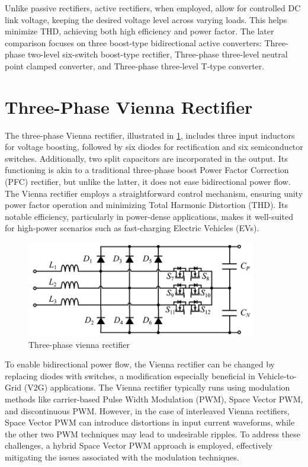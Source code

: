 \documentclass[12pt,a4paper]{book}
\begin{document}
Unlike passive rectifiers, active rectifiers, when employed, allow for controlled DC link voltage, keeping the desired voltage level across varying loads. This helps minimize THD, achieving both high efficiency and power factor. The later comparison focuses on three boost-type bidirectional active converters: Three-phase two-level six-switch boost-type rectifier, Three-phase three-level neutral point clamped converter, and Three-phase three-level T-type converter.

\section{Three-Phase Vienna Rectifier}
The three-phase Vienna rectifier, illustrated in \ref{fig:image4}, includes three input inductors for voltage boosting, followed by six diodes for rectification and six semiconductor switches. Additionally, two split capacitors are incorporated in the output. Its functioning is akin to a traditional three-phase boost Power Factor Correction (PFC) rectifier, but unlike the latter, it does not ease bidirectional power flow. The Vienna rectifier employs a straightforward control mechanism, ensuring unity power factor operation and minimizing Total Harmonic Distortion (THD). Its notable efficiency, particularly in power-dense applications, makes it well-suited for high-power scenarios such as fast-charging Electric Vehicles (EVs).

\begin{figure}[h]
  \centering
  \includegraphics[width=10cm]{image4.png}
  \caption{Three-phase vienna rectifier}
  \label{fig:image4}
\end{figure}

To enable bidirectional power flow, the Vienna rectifier can be changed by replacing diodes with switches, a modification especially beneficial in Vehicle-to-Grid (V2G) applications. The Vienna rectifier typically runs using modulation methods like carrier-based Pulse Width Modulation (PWM), Space Vector PWM, and discontinuous PWM. However, in the case of interleaved Vienna rectifiers, Space Vector PWM can introduce distortions in input current waveforms, while the other two PWM techniques may lead to undesirable ripples. To address these challenges, a hybrid Space Vector PWM approach is employed, effectively mitigating the issues associated with the modulation techniques.
\end{document}
